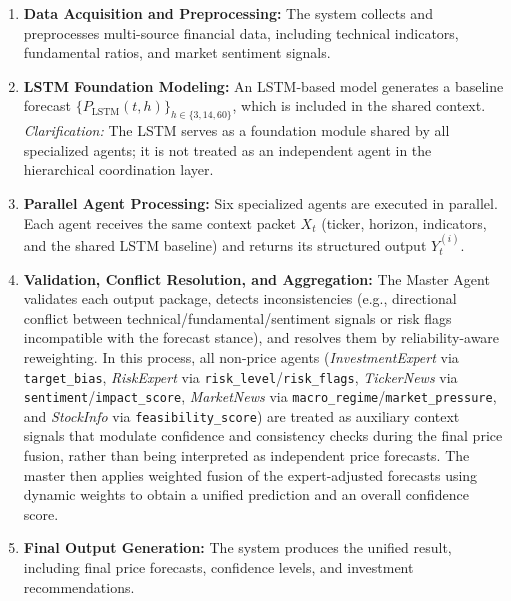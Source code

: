 \documentclass{ieeeaccess}
\begin{document}
\begin{enumerate}
    \item \textbf{Data Acquisition and Preprocessing:} 
    The system collects and preprocesses multi-source financial data, including technical indicators, fundamental ratios, and market sentiment signals.
    
    \item \textbf{LSTM Foundation Modeling:} 
    An LSTM-based model generates a baseline forecast $\{P_{\text{LSTM}}(t,h)\}_{h\in\{3,14,60\}}$, which is included in the shared context.
    \textit{Clarification:} The LSTM serves as a foundation module shared by all specialized agents; it is not treated as an independent agent in the hierarchical coordination layer.
    
    \item \textbf{Parallel Agent Processing:} 
    Six specialized agents are executed in parallel. Each agent receives the same context packet $X_t$ (ticker, horizon, indicators, and the shared LSTM baseline) and returns its structured output $Y_t^{(i)}$.
    
    \item \textbf{Validation, Conflict Resolution, and Aggregation:} 
    The Master Agent validates each output package, detects inconsistencies (e.g., directional conflict between technical/fundamental/sentiment signals or risk flags incompatible with the forecast stance), and resolves them by reliability-aware reweighting. In this process, all non-price agents (\textit{InvestmentExpert} via \texttt{target\_bias}, \textit{RiskExpert} via \texttt{risk\_level}/\texttt{risk\_flags}, \textit{TickerNews} via \texttt{sentiment}/\texttt{impact\_score}, \textit{MarketNews} via \texttt{macro\_regime}/\texttt{market\_pressure}, and \textit{StockInfo} via \texttt{feasibility\_score}) are treated as auxiliary context signals that modulate confidence and consistency checks during the final price fusion, rather than being interpreted as independent price forecasts. The master then applies weighted fusion of the expert-adjusted forecasts using dynamic weights to obtain a unified prediction and an overall confidence score.
    
    \item \textbf{Final Output Generation:} 
    The system produces the unified result, including final price forecasts, confidence levels, and investment recommendations.
\end{enumerate}
\end{document}
